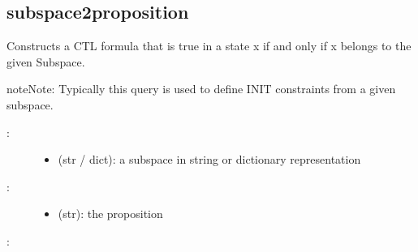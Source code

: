 \documentclass[letterpaper,10pt,english]{sphinxmanual}
\begin{document}
\subsection{subspace2proposition}
\label{\detokenize{TemporalLogic:subspace2proposition}}

\begin{fulllineitems}
\label{\detokenize{TemporalLogic:PyBoolNet.TemporalLogic.subspace2proposition}}
Constructs a CTL formula that is true in a state x if and only if x belongs to the given Subspace.

\begin{sphinxadmonition}{note}{Note:}
Typically this query is used to define INIT constraints from a given subspace.
\end{sphinxadmonition}
\begin{description}
\item[{:}] \leavevmode\begin{itemize}
\item {} 
 (str / dict): a subspace in string or dictionary representation

\end{itemize}

\item[{:}] \leavevmode\begin{itemize}
\item {} 
 (str): the proposition

\end{itemize}

\end{description}

:

\begin{sphinxVerbatim}[commandchars=\\\{\}]
  
    
\end{sphinxVerbatim}

\end{fulllineitems}
\end{document}
